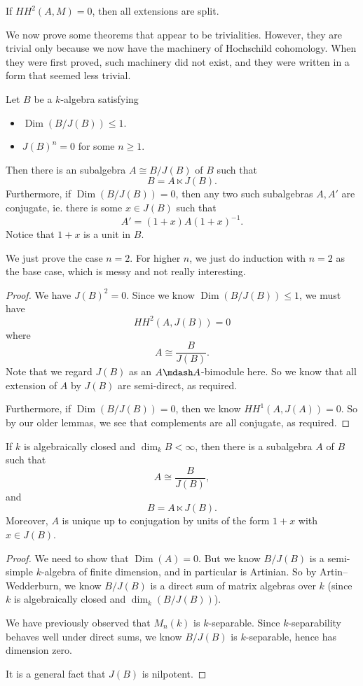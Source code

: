 \documentclass[a4paper]{article}
\DeclareMathOperator\Dim{Dim}
\newcommand\HH{H\!H}
\begin{document}
\begin{cor}
  If $\HH^2(A, M) = 0$, then all extensions are split.
\end{cor}

We now prove some theorems that appear to be trivialities. However, they are trivial only because we now have the machinery of Hochschild cohomology. When they were first proved, such machinery did not exist, and they were written in a form that seemed less trivial.
\begin{thm}
  Let $B$ be a $k$-algebra satisfying
  \begin{itemize}
    \item $\Dim (B/J(B)) \leq 1$.
    \item $J(B)^n = 0$ for some $n \geq 1$.
  \end{itemize}
  Then there is an subalgebra $A \cong B/J(B)$ of $B$ such that
  \[
    B = A \ltimes J(B).
  \]
  Furthermore, if $\Dim (B/J(B)) = 0$, then any two such subalgebras $A, A'$ are conjugate, ie. there is some $x \in J(B)$ such that
  \[
    A' = (1 + x) A (1 + x)^{-1}.
  \]
  Notice that $1 + x$ is a unit in $B$.
\end{thm}

We just prove the case $n = 2$. For higher $n$, we just do induction with $n = 2$ as the base case, which is messy and not really interesting.

\begin{proof}
  We have $J(B)^2 = 0$. Since we know $\Dim (B/J(B)) \leq 1$, we must have
  \[
    \HH^2(A, J(B)) = 0
  \]
  where
  \[
    A \cong \frac{B}{J(B)}.
  \]
  Note that we regard $J(B)$ as an $A\mdash A$-bimodule here. So we know that all extension of $A$ by $J(B)$ are semi-direct, as required.

  Furthermore, if $\Dim (B/J(B)) = 0$, then we know $\HH^1(A, J(A)) = 0$. So by our older lemmas, we see that complements are all conjugate, as required.
\end{proof}

\begin{cor}
  If $k$ is algebraically closed and $\dim_k B < \infty$, then there is a subalgebra $A$ of $B$ such that
  \[
    A \cong \frac{B}{J(B)},
  \]
  and
  \[
    B = A \ltimes J(B).
  \]
  Moreover, $A$ is unique up to conjugation by units of the form $1 + x$ with $x \in J(B)$.
\end{cor}

\begin{proof}
  We need to show that $\Dim (A) = 0$. But we know $B/J(B)$ is a semi-simple $k$-algebra of finite dimension, and in particular is Artinian. So by Artin--Wedderburn, we know $B/J(B)$ is a direct sum of matrix algebras over $k$ (since $k$ is algebraically closed and $\dim_k(B/J(B))$).

  We have previously observed that $M_n(k)$ is $k$-separable. Since $k$-separability behaves well under direct sums, we know $B/J(B)$ is $k$-separable, hence has dimension zero.

  It is a general fact that $J(B)$ is nilpotent.
\end{proof}
\end{document}
